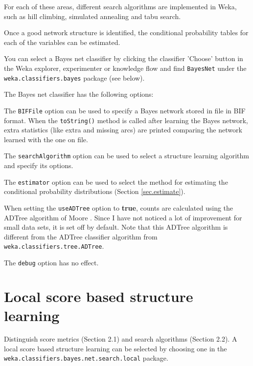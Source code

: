 \documentclass[a4paper]{article}
\begin{document}
For each of these areas, different search algorithms are implemented in 
Weka, such as hill climbing, simulated annealing and tabu search.

Once a good network structure is identified, the conditional probability
tables for each of the variables can be estimated.

You can select a Bayes net classifier by clicking the classifier 'Choose' button in 
the Weka explorer, experimenter or knowledge flow and find {\tt BayesNet}
under the {\tt weka.classifiers.bayes} package (see below).

\begin{center}
\end{center}

The Bayes net classifier has the following options:

\begin{center}
\end{center}

The {\tt BIFFile} option can be used to specify a Bayes network stored in
file in BIF format. When the {\tt toString()} method is called after learning the
Bayes network, extra statistics (like extra and missing arcs) are printed 
comparing the network learned with the one on file.

The {\tt searchAlgorithm} option can be used to select a structure learning
algorithm and specify its options.

The {\tt estimator} option can be used to select the method for estimating the
conditional probability distributions (Section \ref{sec.estimate}).

When setting the {\tt useADTree} option to \textbf{true}, counts are calculated using the
ADTree algorithm of Moore \cite{Moore}. Since I have not noticed a lot of 
improvement for small data sets, it is set off by default.
Note that this ADTree algorithm is different from the ADTree classifier algorithm
from {\tt weka.classifiers.tree.ADTree}.

The {\tt debug} option has no effect.

\section{Local score based structure learning\label{sec.score}}

Distinguish score metrics (Section 2.1) and search algorithms (Section 2.2).
A local score based structure learning can be selected by choosing one in the
{\tt weka.classifiers.bayes.net.search.local} package.
\end{document}
